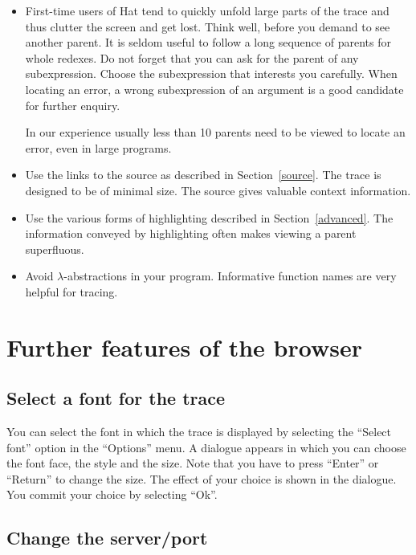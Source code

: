 \documentclass[12pt]{article}
\begin{document}
\begin{itemize}
\item First-time users of Hat tend to quickly unfold large parts of the trace and thus clutter the screen and get lost. Think well, before you demand to see another parent. It is seldom useful to follow a long sequence of parents for whole redexes. Do not forget that you can ask for the parent of any subexpression. Choose the subexpression that interests you carefully. When locating an error, a wrong subexpression of an argument is a good candidate for further enquiry.

In our experience usually less than 10 parents need to be viewed to locate an error, even in large programs.

\item Use the links to the source as described in Section~\ref{source}. The trace is designed to be of minimal size. The source gives valuable context information.

\item Use the various forms of highlighting described in Section~\ref{advanced}. The information conveyed by highlighting often makes viewing a parent superfluous.

\item Avoid $\lambda$-abstractions in your program. Informative function names are very helpful for tracing.

\end{itemize}


\section{Further features of the browser}

\subsection{Select a font for the trace}

You can select the font in which the trace is displayed by selecting the ``Select font'' option in the ``Options'' menu. A dialogue appears in which you can choose the font face, the style and the size. Note that you have to press ``Enter'' or ``Return'' to change the size. The effect of your choice is shown in the dialogue. You commit your choice by selecting ``Ok''.

\subsection{Change the server/port}
\end{document}
